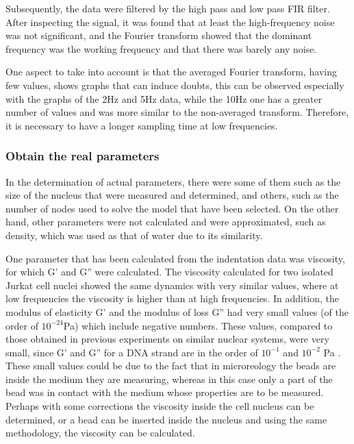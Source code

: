 \documentclass[12pt, a4paper]{article} %
\begin{document}
Subsequently, the data were filtered by the high pass and low pass FIR filter. After inspecting the signal, it was found that at least the high-frequency noise was not significant, and the Fourier transform showed that the dominant frequency was the working frequency and that there was barely any noise.

One aspect to take into account is that the averaged Fourier transform, having few values, shows graphs that can induce doubts, this can be observed especially with the graphs of the 2Hz and 5Hz data, while the 10Hz one has a greater number of values and was more similar to the non-averaged transform. Therefore, it is necessary to have a longer sampling time at low frequencies.

\setlength{\parskip}{0mm}

\subsubsection{Obtain the real parameters}

In the determination of actual parameters, there were some of them such as the size of the nucleus that were measured and determined, and others, such as the number of nodes used to solve the model that have been selected. On the other hand, other parameters were not calculated and were approximated, such as density, which was used as that of water due to its similarity.

\setlength{\parskip}{4mm}

One parameter that has been calculated from the indentation data was viscosity, for which G' and G'' were calculated. The viscosity calculated for two isolated Jurkat cell nuclei showed the same dynamics with very similar values, where at low frequencies the viscosity is higher than at high frequencies. In addition, the modulus of elasticity G' and the modulus of loss G'' had very small values (of the order of $10^{-24}$Pa) which include negative numbers. These values, compared to those obtained in previous experiments on similar nuclear systems, were very small, since G' and G'' for a DNA strand are in the order of $10^{-1}$ and $10^{-2}$ Pa \cite{robertson2018optical}. These small values could be due to the fact that in microreology the beads are inside the medium they are measuring, whereas in this case only a part of the bead was in contact with the medium whose properties are to be measured. Perhaps with some corrections the viscosity inside the cell nucleus can be determined, or a bead can be inserted inside the nucleus and using the same methodology, the viscosity can be calculated.
\end{document}
